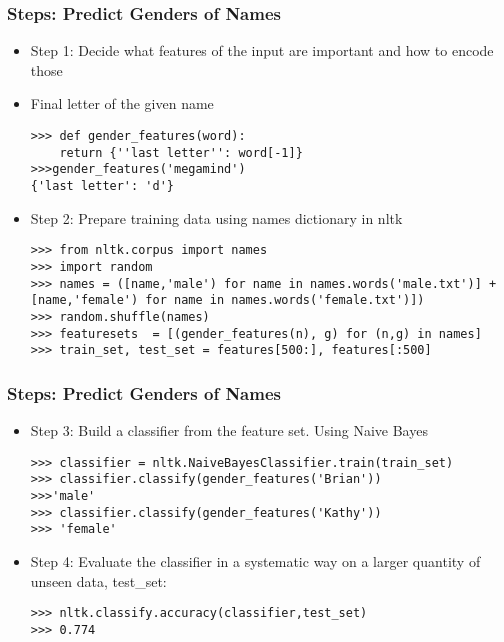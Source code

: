 \begin{frame}[fragile]\frametitle{Steps: Predict Genders of Names}
  \begin{itemize}
\item Step 1: Decide what features of the input are important and how to encode those
\item Final letter of the given name
\begin{lstlisting}
>>> def gender_features(word):
	return {''last letter'': word[-1]}
>>>gender_features('megamind')
{'last letter': 'd'}
\end{lstlisting}
\item Step 2: Prepare training data using names dictionary in nltk
\begin{lstlisting}
>>> from nltk.corpus import names
>>> import random
>>> names = ([name,'male') for name in names.words('male.txt')] +
[name,'female') for name in names.words('female.txt')])
>>> random.shuffle(names)
>>> featuresets  = [(gender_features(n), g) for (n,g) in names]
>>> train_set, test_set = features[500:], features[:500]
\end{lstlisting}
  \end{itemize}
\end{frame}

\begin{frame}[fragile]\frametitle{Steps: Predict Genders of Names}
  \begin{itemize}
\item Step 3: Build a classifier from the feature set. Using Naive Bayes
\begin{lstlisting}
>>> classifier = nltk.NaiveBayesClassifier.train(train_set)
>>> classifier.classify(gender_features('Brian'))
>>>'male'
>>> classifier.classify(gender_features('Kathy'))
>>> 'female'
\end{lstlisting}
\item Step 4: Evaluate the classifier in a systematic way on a larger quantity of unseen data, test\_set:
\begin{lstlisting}
>>> nltk.classify.accuracy(classifier,test_set)
>>> 0.774
\end{lstlisting}
  \end{itemize}
\end{frame}

